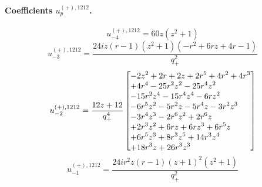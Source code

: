\documentclass[11pt,a4paper]{article}
\begin{document}
\paragraph{Coefficients $u_p^{(+),1212}$.}
\begin{equation}
u_{-4}^{(+),1212}=60 z \left(z^{2} + 1\right)
\label{eq:cat-auxiliary-plus-1212-m4}
\end{equation}
\begin{equation}
u_{-3}^{(+),1212}=\frac{24 i z \left(r - 1\right) \left(z^{2} + 1\right) \left(- r^{2} + 6 r z + 4 r - 1\right)}{q_{+}^{2}}
\label{eq:cat-auxiliary-plus-1212-m3}
\end{equation}
\begin{equation}
u_{-2}^{(+),1212}=\frac{12 z + 12}{q_{+}^{4}}\left[\vcenter{\hbox{\shortstack[l]{$\displaystyle  - 2 z^{2} + 2 r + 2 z + 2 r^{5} + 4 r^{2} + 4 r^{3}$\\
$\displaystyle  + 4 r^{4} - 25 r^{2} z^{2} - 25 r^{4} z^{2}$\\
$\displaystyle  - 15 r^{2} z^{4} - 15 r^{4} z^{4} - 6 r z^{2}$\\
$\displaystyle  - 6 r^{5} z^{2} - 5 r^{2} z - 5 r^{4} z - 3 r^{2} z^{3}$\\
$\displaystyle  - 3 r^{4} z^{3} - 2 r^{6} z^{2} + 2 r^{6} z$\\
$\displaystyle  + 2 r^{3} z^{2} + 6 r z + 6 r z^{3} + 6 r^{5} z$\\
$\displaystyle  + 6 r^{5} z^{3} + 8 r^{3} z^{5} + 14 r^{3} z^{4}$\\
$\displaystyle  + 18 r^{3} z + 26 r^{3} z^{3}$}}}\right]
\label{eq:cat-auxiliary-plus-1212-m2}
\end{equation}
\begin{equation}
u_{-1}^{(+),1212}=\frac{24 i r^{2} z \left(r - 1\right) \left(z + 1\right)^{2} \left(z^{2} + 1\right)}{q_{+}^{2}}
\label{eq:cat-auxiliary-plus-1212-m1}
\end{equation}
\end{document}
